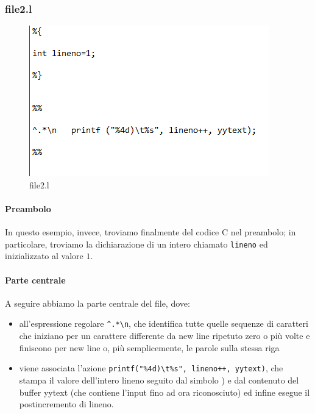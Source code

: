 \documentclass[class=book, crop=false, oneside, 12pt]{standalone}
\begin{document}
\subsubsection{file2.l}

\begin{figure}[h]
    \centering
    \includegraphics[width=.7\textwidth,keepaspectratio]{file2.l.png}
    \caption{file2.l}
    \label{file2.l}
\end{figure}

\paragraph{Preambolo}
In questo esempio, invece, troviamo finalmente del codice C nel preambolo; in particolare, troviamo la dichiarazione di un intero chiamato \texttt{lineno} ed inizializzato al valore \(1\). 

\paragraph{Parte centrale}
A seguire abbiamo la parte centrale del file, dove: 

\begin{itemize}
    \item all'espressione regolare \texttt{\^{}.*\textbackslash n}, che identifica tutte quelle sequenze di caratteri che iniziano per un carattere differente da new line ripetuto zero o più volte e finiscono per new line o, più semplicemente, le parole sulla stessa riga
    \item  viene associata l'azione \texttt{printf("\%4d)\textbackslash t\%s", lineno++, yytext)}, che stampa il valore dell'intero lineno seguito dal simbolo ) e dal contenuto del buffer yytext (che contiene l'input fino ad ora riconosciuto) ed infine esegue il postincremento di lineno.
\end{itemize}
\end{document}
